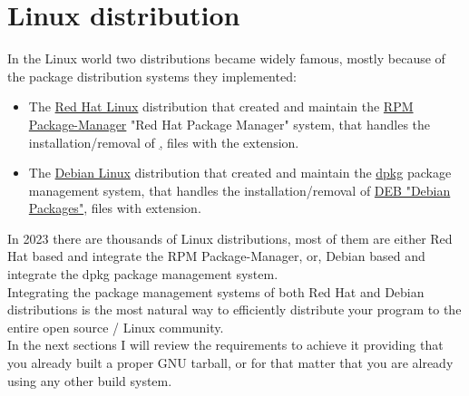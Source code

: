 \chapter{Linux distribution}

In the Linux world two distributions became widely famous, mostly because of the package distribution systems they implemented: 
\begin{itemize}
\item The \href{https://www.redhat.com}{Red Hat Linux} distribution that created and maintain the \href{https://en.wikipedia.org/wiki/RPM\_Package\_Manager}{RPM Package-Manager} "Red Hat Package Manager" system, that handles the installation/removal of \href{RPM "Red Hat Packages"}, files with the  extension.
\item The \href{https://www.debian.org}{Debian Linux} distribution that created and maintain the \href{https://en.wikipedia.org/wiki/Dpkg}{dpkg} package management system, that handles the installation/removal of \href{https://en.wikipedia.org/wiki/Deb\_(file\_format)}{DEB "Debian Packages"}, files with  extension.
\end{itemize}
In 2023 there are thousands of Linux distributions, most of them are either Red Hat based and integrate the RPM Package-Manager, or, Debian based and integrate the dpkg package management system. \\
Integrating the package management systems of both Red Hat and Debian distributions is the most natural way to efficiently distribute your program to the entire open source / Linux community. \\
In the next sections I will review the requirements to achieve it providing that you already built a proper GNU tarball, or for that matter that you are already using any other build system. 
\clearpage





